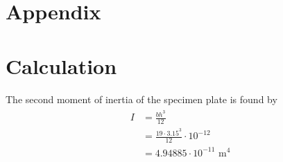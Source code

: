\documentclass[12pt]{article}
\begin{document}
\clearpage
\appendix
\section*{Appendix}
\section{Calculation}
\label{sec:A-calculation}
    The second moment of inertia of the specimen plate is found by
    \begin{align}
        \label{eq:second_moment_inertia}
        \begin{split}
            I &= \frac{b h^3}{12}\\
            &= \frac{19\cdot3.15^3}{12}\cdot10^{-12}\\
            &=4.94885\cdot10^{-11}\,\,\text{m}^4\\
        \end{split}
    \end{align}
\end{document}
